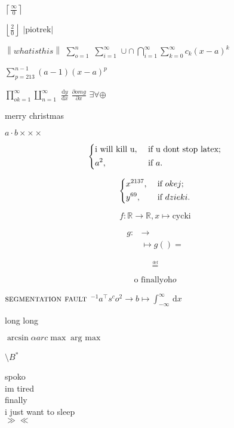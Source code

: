 \documentclass{article}
\begin{document}
\(\left\lceil \frac{\infty}{0}  \right\rceil \) 

\(\left\lfloor \frac{2}{0} \right\rfloor\) 
\(\left\vert \text{piotrek} \right\vert \) 

\(\left\lVert what is this \right\rVert \) 
\( \sum\limits_{o=1}^{n}  \) 
\(\sum_{i=1}^{\infty} \) 
\(\cup \cap \bigcap\limits_{i=1}^{\infty} \sum\limits_{k=0}^{\infty} c_k (x-a)^k \) 

\(\sum\limits_{p=213}^{n-1} (a-1) (x-a)^p \) 

\(\prod\limits_{ok=1}^{\infty} \coprod\limits_{n=1}^{\infty} \) 
\(\frac{\mathrm{d}y}{\mathrm{d}x} \) 
\(\frac{\partial omg}{\partial x} \) 
\(\exists \forall \oplus  \)

merry christmas 

\(a \cdot b \times \times \times \nonumber \)

\[
    \begin{dcases}
        \text{i will kill u}, &\text{ if }  \text{u dont stop latex;}\\
        a^2, &\text{ if }  a.
    \end{dcases}
\]

\[
    \begin{dcases}
        x^{2137} , &\text{ if } okej ;\\
        y^{69} , &\text{ if } dzieki .
    \end{dcases}
\]

\[
    f \colon \mathbb{R} \to \mathbb{R}, x \mapsto \text{cycki}
\]

\[
    \begin{aligned}
        g \colon  & \longrightarrow       \\
                  & \longmapsto g () = 
    \end{aligned}
\]

\[
    \overset{\underset{\mathrm{def}}{}}{=} 
\]

\[
    \text{o finally}
    \textit{oho}  
\]

\(\textsc{segmentation fault} \) 
\(^{-1} a^{\top} s^{c} o^{2} \to b \mapsto \int_{-\infty}^{\infty}  \,\mathrm{d}x \) 

long long 

\(\arcsin \alpha arc\mathop{\max} \underset{}{\mathop{\arg\ \max}} \) 

\(\setminus B ^{\ast} \) 

spoko \\
im tired\\
finally\\
i just want to sleep\\
\(\gg \ll \) 
\end{document}

